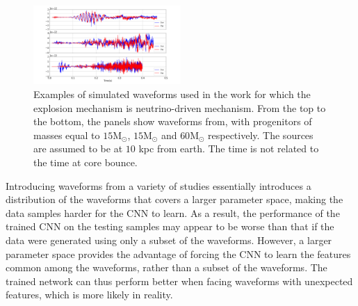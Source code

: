 \documentclass[aps,twocolumn,showpacs,groupedaddress, nofootinbib]{revtex4}  %
\begin{document}
\begin{figure}
\includegraphics[width=0.5\textwidth]{neu_waveforms.png}
\caption{Examples of simulated waveforms used in the work for which the explosion mechanism is neutrino-driven mechanism.
From the top to the bottom, the panels show waveforms from\cite{10.1093mnrasstz990, murphy2009model, radice2019characterizing}, with progenitors of masses equal to $15\text{M}_\odot$,
$15\text{M}_\odot$ and $60\text{M}_\odot$ respectively. 
The sources are assumed to be at $10$ kpc from earth. The time is not related to the time at core bounce.
\label{fig:neuwaveforms}}
\end{figure}
Introducing waveforms from a variety of studies essentially introduces a distribution of the waveforms that covers a larger parameter space, 
making the data samples harder for the \ac{CNN} to learn.
As a result, the performance of the trained \ac{CNN} on the testing samples 
may appear to be worse than that if the data were generated using only a subset of the waveforms.
However, a larger parameter space provides the advantage of forcing the \ac{CNN} to 
learn the features common among the waveforms, rather than a subset of the waveforms.
The trained network can thus perform better when facing waveforms with unexpected features, which is more likely in reality.
\end{document}
